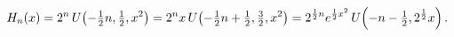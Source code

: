 \[\mathop{H_{n}\/}\nolimits\!\left(x\right)=2^{n}\mathop{U\/}\nolimits\!\left(-%
\tfrac{1}{2}n,\tfrac{1}{2},x^{2}\right)=2^{n}x\mathop{U\/}\nolimits\!\left(-%
\tfrac{1}{2}n+\tfrac{1}{2},\tfrac{3}{2},x^{2}\right)=2^{\frac{1}{2}n}e^{\frac{%
1}{2}x^{2}}\mathop{U\/}\nolimits\!\left(-n-\tfrac{1}{2},2^{\frac{1}{2}}x\right).\]